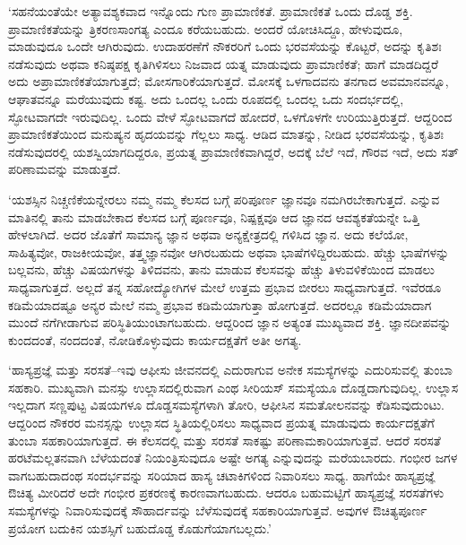 ‘ಸಹನೆಯಂತೆಯೇ ಅತ್ಯಾವಶ್ಯಕವಾದ ಇನ್ನೊಂದು ಗುಣ ಪ್ರಾಮಾಣಿಕತೆ. ಪ್ರಾಮಾಣಿಕತೆ ಒಂದು ದೊಡ್ಡ ಶಕ್ತಿ. ಪ್ರಾಮಾಣಿಕತೆಯನ್ನು ತ್ರಿಕರಣಸಾಂಗತ್ಯ ಎಂದೂ ಕರೆಯಬಹುದು. ಅಂದರೆ ಯೋಚಿಸಿದ್ದೂ, ಹೇಳುವುದೂ, ಮಾಡುವುದೂ ಒಂದೇ ಆಗಿರುವುದು. ಉದಾಹರಣೆಗೆ ನೌಕರರಿಗೆ ಒಂದು ಭರವಸೆಯನ್ನು ಕೊಟ್ಟರೆ, ಅದನ್ನು ಕೃತಿಶಃ ನಡೆಸುವುದು ಅಥವಾ ಕನಿಷ್ಠಪಕ್ಷ ಕೃತಿಗಿಳಿಸಲು ನಿಜವಾದ ಯತ್ನ ಮಾಡುವುದು ಪ್ರಾಮಾಣಿಕತೆ; ಹಾಗೆ ಮಾಡದಿದ್ದರೆ ಅದು ಅಪ್ರಾಮಾಣಿಕತೆಯಾಗುತ್ತದೆ; ಮೋಸಗಾರಿಕೆಯಾಗುತ್ತದೆ. ಮೋಸಕ್ಕೆ ಒಳಗಾದವನು ತನಗಾದ ಅವಮಾನವನ್ನೂ, ಆಘಾತವನ್ನೂ ಮರೆಯುವುದು ಕಷ್ಟ. ಅದು ಒಂದಲ್ಲ ಒಂದು ರೂಪದಲ್ಲಿ ಒಂದಲ್ಲ ಒದು ಸಂದರ್ಭದಲ್ಲಿ, ಸ್ಫೋಟವಾಗದೇ ಇರುವುದಿಲ್ಲ. ಒಂದು ವೇಳೆ ಸ್ಫೋಟವಾಗದೆ ಹೋದರೆ, ಒಳಗೊಳಗೇ ಉರಿಯುತ್ತಿರುತ್ತದೆ. ಆದ್ದರಿಂದ ಪ್ರಾಮಾಣಿಕತೆಯಿಂದ ಮನುಷ್ಯನ ಹೃದಯವನ್ನು ಗೆಲ್ಲಲು ಸಾಧ್ಯ. ಆಡಿದ ಮಾತನ್ನು, ನೀಡಿದ ಭರವಸೆಯನ್ನು, ಕೃತಿಶಃ ನಡೆಸುವುದರಲ್ಲಿ ಯಶಸ್ವಿಯಾಗದಿದ್ದರೂ, ಪ್ರಯತ್ನ ಪ್ರಾಮಾಣಿಕವಾಗಿದ್ದರೆ, ಅದಕ್ಕೆ ಬೆಲೆ ಇದೆ, ಗೌರವ ಇದೆ, ಅದು ಸತ್​ಪರಿಣಾಮವನ್ನು ಮಾಡುತ್ತದೆ.

‘ಯಶಸ್ಸಿನ ನಿಚ್ಚಣಿಕೆಯನ್ನೇರಲು ನಮ್ಮ ನಮ್ಮ ಕೆಲಸದ ಬಗ್ಗೆ ಪರಿಪೂರ್ಣ ಜ್ಞಾನವೂ ನಮಗಿರ\-ಬೇಕಾಗುತ್ತದೆ.  ಎನ್ನುವ ಮಾತಿನಲ್ಲಿ ತಾನು ಮಾಡಬೇಕಾದ ಕೆಲಸದ ಬಗ್ಗೆ ಪೂರ್ಣವೂ, ನಿಷ್ಪಕ್ಷವೂ ಆದ ಜ್ಞಾನದ ಆವಶ್ಯಕತೆಯನ್ನೇ ಒತ್ತಿ ಹೇಳಲಾಗಿದೆ. ಅದರ ಜೊತೆಗೆ ಸಾಮಾನ್ಯ ಜ್ಞಾನ ಅಥವಾ ಅನ್ಯಕ್ಷೇತ್ರದಲ್ಲಿ ಗಳಿಸಿದ ಜ್ಞಾನ. ಅದು ಕಲೆಯೋ, ಸಾಹಿತ್ಯವೋ, ರಾಜಕೀಯವೋ, ತತ್ತ್ವಜ್ಞಾನವೋ ಆಗಿರಬಹುದು ಅಥವಾ ಭಾಷೆಗಳಿದ್ದಿರಬಹುದು. ಹೆಚ್ಚು ಭಾಷೆಗಳನ್ನು ಬಲ್ಲವನು, ಹೆಚ್ಚು ವಿಷಯಗಳನ್ನು ತಿಳಿದವನು, ತಾನು ಮಾಡುವ ಕೆಲಸವನ್ನು ಹೆಚ್ಚು ತಿಳುವಳಿಕೆಯಿಂದ ಮಾಡಲು ಸಾಧ್ಯವಾಗುತ್ತದೆ. ಅಲ್ಲದೆ ತನ್ನ ಸಹೋದ್ಯೋಗಿಗಳ ಮೇಲೆ ಉತ್ತಮ ಪ್ರಭಾವ ಬೀರಲು ಸಾಧ್ಯವಾಗುತ್ತದೆ.  ಇವೆರಡೂ ಕಡಿಮೆಯಾದಷ್ಟೂ ಅನ್ಯರ ಮೇಲೆ ನಮ್ಮ ಪ್ರಭಾವ ಕಡಿಮೆಯಾಗುತ್ತಾ ಹೋಗುತ್ತದೆ. ಅದರಲ್ಲೂ  ಕಡಿಮೆಯಾದಾಗ ಮುಂದೆ ನಗೆಗೀಡಾಗುವ ಪರಿಸ್ಥಿತಿಯುಂಟಾಗಬಹುದು. ಆದ್ದರಿಂದ ಜ್ಞಾನ ಅತ್ಯಂತ ಮುಖ್ಯವಾದ ಶಕ್ತಿ. ಜ್ಞಾನದೀಪವನ್ನು ಕುಂದದಂತೆ, ನಂದದಂತೆ, ನೋಡಿಕೊಳ್ಳುವುದು ಕಾರ್ಯದಕ್ಷತೆಗೆ ಅತೀ ಅಗತ್ಯ.

‘ಹಾಸ್ಯಪ್ರಜ್ಞೆ ಮತ್ತು ಸರಸತೆ–ಇವು ಆಫೀಸು ಜೀವನದಲ್ಲಿ ಎದುರಾಗುವ ಅನೇಕ ಸಮಸ್ಯೆಗಳನ್ನು ಎದುರಿಸುವಲ್ಲಿ ತುಂಬಾ ಸಹಕಾರಿ. ಮುಖ್ಯವಾಗಿ ಮನಸ್ಸು ಉಲ್ಲಾಸದಲ್ಲಿರುವಾಗ ಎಂಥ ಸೀರಿಯಸ್ ಸಮಸ್ಯೆಯೂ ದೊಡ್ಡದಾಗುವುದಿಲ್ಲ. ಉಲ್ಲಾಸ ಇಲ್ಲದಾಗ ಸಣ್ಣಪುಟ್ಟ ವಿಷಯಗಳೂ ದೊಡ್ಡಸಮಸ್ಯೆಗಳಾಗಿ ತೋರಿ, ಆಫೀಸಿನ ಸಮತೋಲನವನ್ನು ಕೆಡಿಸುವುದುಂಟು. ಆದ್ದರಿಂದ ನೌಕರರ ಮನಸ್ಸನ್ನು ಉಲ್ಲಾಸದ ಸ್ಥಿತಿಯಲ್ಲಿರಿಸಲು ಸಾಧ್ಯವಾದ ಪ್ರಯತ್ನ ಮಾಡುವುದು ಕಾರ್ಯದಕ್ಷತೆಗೆ ತುಂಬಾ ಸಹಕಾರಿಯಾಗುತ್ತದೆ. ಈ ಕೆಲಸದಲ್ಲಿ  ಮತ್ತು ಸರಸತೆ ಸಾಕಷ್ಟು ಪರಿಣಾಮಕಾರಿಯಾಗುತ್ತವೆ. ಆದರೆ ಸರಸತೆ ಹರಟೆಮಲ್ಲತನವಾಗಿ ಬೆಳೆಯದಂತೆ ನಿಯಂತ್ರಿಸುವುದೂ ಅಷ್ಟೇ ಅಗತ್ಯ ಎನ್ನುವುದನ್ನು ಮರೆಯಬಾರದು. ಗಂಭೀರ ಜಗಳ ವಾಗಬಹುದಾದಂಥ ಸಂದರ್ಭವನ್ನು ಸರಿಯಾದ ಹಾಸ್ಯ ಚಟಾಕಿಗಳಿಂದ ನಿವಾರಿಸಲು ಸಾಧ್ಯ. ಹಾಗೆಯೇ ಹಾಸ್ಯಪ್ರಜ್ಞೆ ಔಚಿತ್ಯ ಮೀರಿದರೆ ಅದೇ ಗಂಭೀರ ಪ್ರಕರಣಕ್ಕೆ ಕಾರಣವಾಗಬಹುದು. ಆದರೂ ಬಹುಮಟ್ಟಿಗೆ ಹಾಸ್ಯಪ್ರಜ್ಞೆ ಸರಸತೆಗಳು ಸಮಸ್ಯೆಗಳನ್ನು ನಿವಾರಿಸುವುದಕ್ಕೆ ಸೌಹಾರ್ದವನ್ನು ಬೆಳೆಸುವುದಕ್ಕೆ ಸಹಕಾರಿಯಾಗುತ್ತವೆ. ಅವುಗಳ ಔಚಿತ್ಯಪೂರ್ಣ ಪ್ರಯೋಗ ಬದುಕಿನ ಯಶಸ್ಸಿಗೆ ಬಹುದೊಡ್ಡ ಕೊಡುಗೆಯಾಗಬಲ್ಲದು.’


